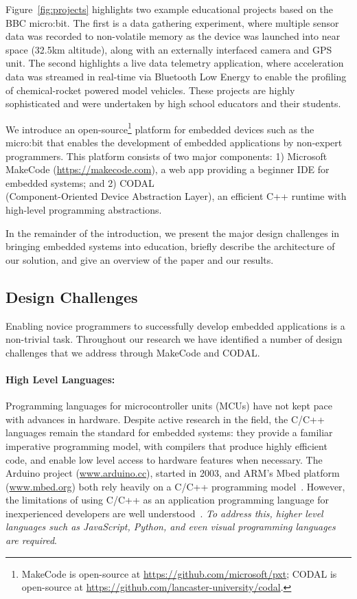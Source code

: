 Figure~\ref{fig:projects} highlights two example educational projects based on the BBC micro:bit. The first is a data gathering experiment, where multiple sensor data was recorded to non-volatile memory as the device was launched into near space (32.5km altitude), along with an externally interfaced camera and GPS unit. The second highlights a live data telemetry application, where acceleration data was streamed in real-time via Bluetooth Low Energy to enable the profiling of chemical-rocket powered model vehicles. These projects are highly sophisticated and were undertaken by high school educators and their students.

We introduce an open-source\footnote{
MakeCode is open-source at \url{https://github.com/microsoft/pxt}; CODAL is open-source at
\url{https://github.com/lancaster-university/codal}.} platform for embedded devices such as the micro:bit that enables the development of embedded applications by non-expert programmers. This platform consists of two major components: 1) Microsoft MakeCode (\url{https://makecode.com}), a web app providing a beginner IDE for embedded
systems; and 2) CODAL\\(Component-Oriented Device Abstraction Layer), an efficient C++ runtime with high-level programming abstractions.

In the remainder of the introduction, we present the major design challenges in
bringing embedded systems into education, briefly describe the
architecture of our solution, and give an overview of the
paper and our results.

\subsection{Design Challenges}
\label{sec:DesignChallenges}
Enabling novice programmers to successfully develop embedded applications is a non-trivial task. Throughout our research we have identified a number of design challenges that we address through MakeCode and CODAL.

\paragraph{High Level Languages:}
Programming languages for microcontroller units (MCUs) have not kept pace with advances in hardware. Despite active research in the field, the C/C++ languages remain the standard for embedded systems: they provide a familiar imperative programming model, with compilers that produce highly efficient code, and enable low level access to hardware features when necessary. The Arduino project (\url{www.arduino.cc}), started in 2003, and ARM's Mbed platform (\url{www.mbed.org}) both rely heavily on a C/C++ programming model~\cite{buildingArduino2014,ARMmbed}. However, the limitations of using C/C++ as an application programming language for inexperienced developers are well understood~\cite{blikstein2013gears}. \emph{To address this, higher level languages such as JavaScript, Python, and even visual programming languages are required}.

